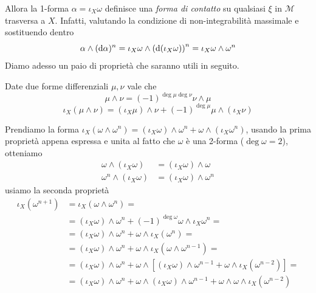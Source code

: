 Allora la 1-forma $\alpha = \iota_X \omega$ definisce una \emph{forma di contatto} su qualsiasi $\xi$ in $\mathcal{M}$ trasversa a $X$.
Infatti, valutando la condizione di non-integrabilità massimale e sostituendo dentro
\[
    \alpha \wedge (\odif{\alpha})^n = \iota_X \omega \wedge \left(\odif{(\iota_X \omega)}\right)^n = \iota_X \omega \wedge \omega^n
\]
Diamo adesso un paio di proprietà che saranno utili in seguito.
\begin{property}
    Date due forme differenziali $\mu, \nu$ vale che
    \begin{equation}
        \mu \wedge \nu = (-1)^{\deg \mu \deg \nu} \nu \wedge \mu
    \end{equation}
    \begin{equation}
        \iota_X (\mu \wedge \nu) = (\iota_X \mu) \wedge \nu + (-1)^{\deg \mu} \mu \wedge (\iota_X \nu)
    \end{equation}
\end{property}
Prendiamo la forma \( \iota_X (\omega \wedge \omega^n) = (\iota_X \omega) \wedge \omega^n + \omega \wedge (\iota_X \omega^n) \), usando la prima proprietà appena espressa e unita al fatto che $\omega$ è una 2-forma (\( \deg \omega = 2 \)), otteniamo
\begin{align*}
    \omega \wedge (\iota_X \omega)   & = (\iota_X \omega) \wedge \omega   \\
    \omega^n \wedge (\iota_X \omega) & = (\iota_X \omega) \wedge \omega^n
\end{align*}
usiamo la seconda proprietà
\begin{align*}
    \iota_X (\omega^{n+1}) & = \iota_X (\omega \wedge \omega^n) =                                                                                                           \\
                           & = (\iota_X \omega) \wedge \omega^n + (-1)^{\deg \omega} \omega \wedge \iota_X \omega^n =                                                       \\
                           & = (\iota_X \omega) \wedge \omega^n + \omega \wedge \iota_X(\omega^n) =                                                                         \\
                           & = (\iota_X \omega) \wedge \omega^n + \omega \wedge \iota_X (\omega \wedge \omega^{n-1}) =                                                      \\
                           & = (\iota_X \omega) \wedge \omega^n + \omega \wedge \left[ (\iota_X \omega) \wedge \omega^{n-1} + \omega \wedge \iota_X (\omega^{n-2})\right] = \\
                           & = (\iota_X \omega) \wedge \omega^n + \omega \wedge (\iota_X \omega) \wedge \omega^{n-1} + \omega \wedge \omega \wedge \iota_X (\omega^{n-2})
\end{align*}
